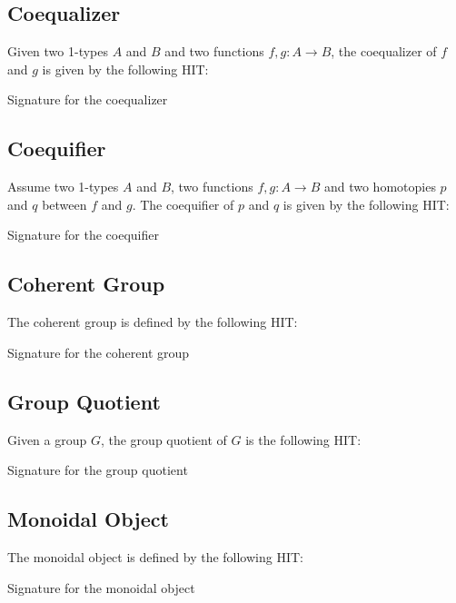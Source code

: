 \subsection{Coequalizer}
\label{sec:coequalizer}

Given two 1-types $A$ and $B$ and two functions $f , g: A \to B$, the
coequalizer of $f$ and $g$ is given by the following HIT:

Signature for the coequalizer

\subsection{Coequifier}
\label{sec:coequifier}

Assume two 1-types $A$ and $B$, two functions $f , g: A \to B$ and two
homotopies $p$ and $q$ between $f$ and $g$. The coequifier of $p$ and
$q$ is given by the following HIT:

Signature for the coequifier

\subsection{Coherent Group}
\label{sec:coeherent_group}

The coherent group is defined by the following HIT:

Signature for the coherent group

\subsection{Group Quotient}
\label{sec:group_quotient}

Given a group $G$, the group quotient of $G$ is the following HIT:

Signature for the group quotient

\subsection{Monoidal Object}
\label{sec:monoidal_object}

The monoidal object is defined by the following HIT:

Signature for the monoidal object
